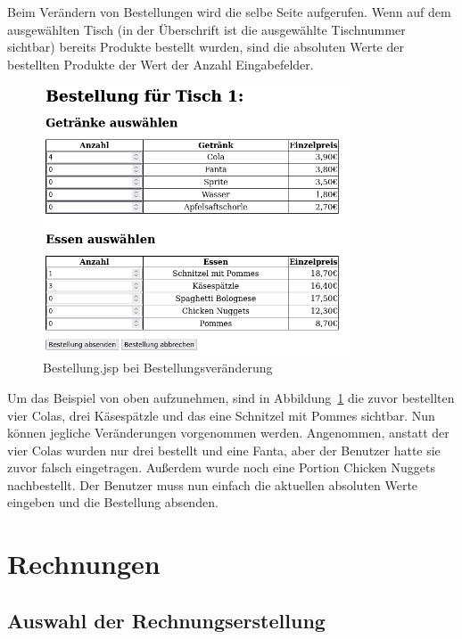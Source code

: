 Beim Verändern von Bestellungen wird die selbe Seite aufgerufen.
Wenn auf dem ausgewählten Tisch (in der Überschrift ist die ausgewählte Tischnummer sichtbar) bereits Produkte bestellt wurden, sind die absoluten Werte der bestellten Produkte der Wert der Anzahl Eingabefelder.

\begin{figure}[htb]
  \centering
  \includegraphics[height=8cm]{images/ChangeBestellungJSP.png}
  \caption[Bestellung.jsp bei Bestellungsveränderung]{Bestellung.jsp bei Bestellungsveränderung}
  \label{abb:ChangeBestellungJSP}
\end{figure}

Um das Beispiel von oben aufzunehmen, sind in Abbildung~\ref{abb:ChangeBestellungJSP} die zuvor bestellten vier Colas, drei Käsespätzle und das eine Schnitzel mit Pommes sichtbar.
Nun können jegliche Veränderungen vorgenommen werden.
Angenommen, anstatt der vier Colas wurden nur drei bestellt und eine Fanta, aber der Benutzer hatte sie zuvor falsch eingetragen.
Außerdem wurde noch eine Portion Chicken Nuggets nachbestellt.
Der Benutzer muss nun einfach die aktuellen absoluten Werte eingeben und die Bestellung absenden.


\section{Rechnungen} %
\label{sec:Rechnungen}

\subsection{Auswahl der Rechnungserstellung} %
\label{sub:Auswahl der Rechnungserstellung}


